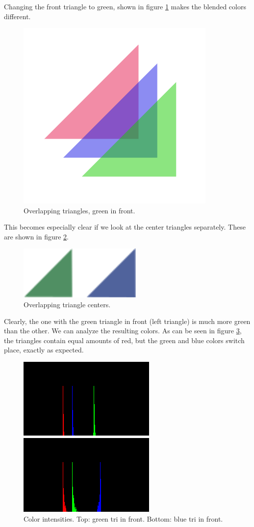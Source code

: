 \documentclass[]{article}
\begin{document}
\begin{multicols}{2}
\subsubsection{}
Changing the front triangle to green, shown in figure \ref{fig:overlap2} makes the blended colors different.
\begin{figure}[H]
\centering
\includegraphics[width=0.5\columnwidth]{overlap2.png}
\caption{Overlapping triangles, green in front.}
\label{fig:overlap2}
\end{figure}
This becomes especially clear if we look at the center triangles separately. These are shown in figure \ref{fig:tris_centers}.
\begin{figure}[H]
\centering
\includegraphics[width=0.5\columnwidth]{tris_centers.png}
\caption{Overlapping triangle centers.}
\label{fig:tris_centers}
\end{figure}
Clearly, the one with the green triangle in front (left triangle) is much more green than the other. We can analyze the resulting colors. As can be seen in figure \ref{fig:colors}, the triangles contain equal amounts of red, but the green and blue colors switch place, exactly as expected.
\begin{figure}[H]
\centering
\includegraphics[width=0.5\columnwidth]{colors.png}
\caption{Color intensities. Top: green tri in front. Bottom: blue tri in front.}
\label{fig:colors}
\end{figure}


\end{multicols}
\end{document}
